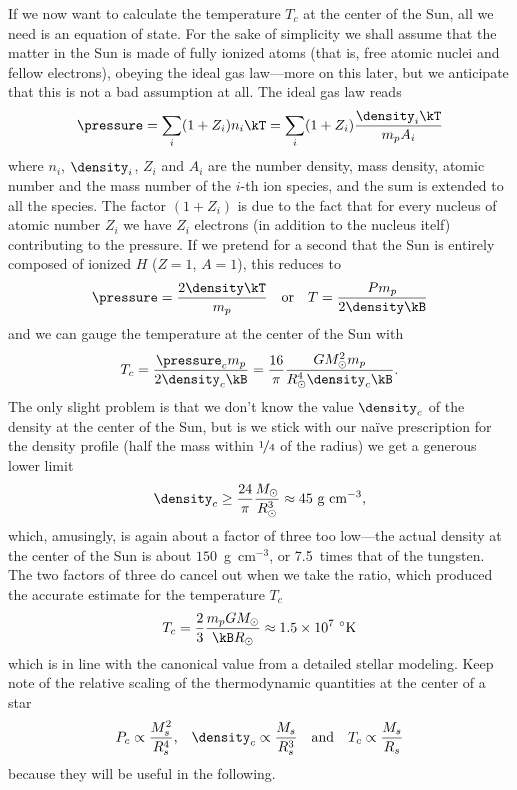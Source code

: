 If we now want to calculate the temperature $T_c$ at the center of the Sun, all we
need is an equation of state. For the sake of simplicity we shall assume that the
matter in the Sun is made of fully ionized atoms (that is, free atomic nuclei and
fellow electrons), obeying the ideal gas law---more on this later, but we anticipate
that this is not a bad assumption at all. The ideal gas law reads
\begin{align}
  \pressure = \sum_i (1 + Z_i)n_i \kT = \sum_i (1 + Z_i) \frac{\density_i \kT}{m_p A_i}
\end{align}
where $n_i$, $\density_i$, $Z_i$ and $A_i$ are the number density, mass density,
atomic number and the mass number of the $i$-th ion species, and the sum is extended
to all the species. The factor $(1 + Z_i)$ is due to the fact that for every nucleus
of atomic number $Z_i$ we have $Z_i$ electrons (in addition to the nucleus itelf)
contributing to the pressure. If we pretend for a second that the Sun is entirely
composed of ionized $H$ ($Z = 1$, $A = 1$), this reduces to
\begin{align*}
	\pressure = \frac{2\density \kT}{m_p} \quad\text{or}\quad
  T = \frac{P m_p}{2\density \kB}
\end{align*}
and we can gauge the temperature at the center of the Sun with
\begin{align*}
  T_c = \frac{\pressure_c m_p}{2 \density_c \kB} =
	\frac{16}{\pi} \frac{G M_\odot^2 m_p}{R_\odot^4 \density_c \kB}.
\end{align*}
The only slight problem is that we don't know the value $\density_c$ of the density
at the center of the Sun, but is we stick with our na\"ive prescription for the density
profile (half the mass within $\nicefrac{1}{4}$ of the radius) we get a generous
lower limit
\begin{align*}
	\density_c \geq \frac{24}{\pi} \frac{M_\odot}{R_\odot^3} \approx 45~\text{g~cm}^{-3},
\end{align*}
which, amusingly, is again about a factor of three too low---the actual density at
the center of the Sun is about $150$~g~cm$^{-3}$, or 7.5~times that of the tungsten.
The two factors of three do cancel out when we take the ratio, which produced the
accurate estimate for the temperature $T_c$
\begin{align*}
	T_c = \frac{2}{3} \frac{m_p G M_\odot}{\kB R_\odot} \approx 1.5 \times 10^7~^\circ\text{K}
\end{align*}
which is in line with the canonical value from a detailed stellar modeling.
Keep note of the relative scaling of the thermodynamic quantities at the center
of a star
\begin{align}
	P_c \propto \frac{M_s^2}{R_s^4} \text{,}\quad
	\density_c \propto \frac{M_s}{R_s^3} \quad\text{and}\quad
	T_c \propto \frac{M_s}{R_s}
\end{align}
because they will be useful in the following.


